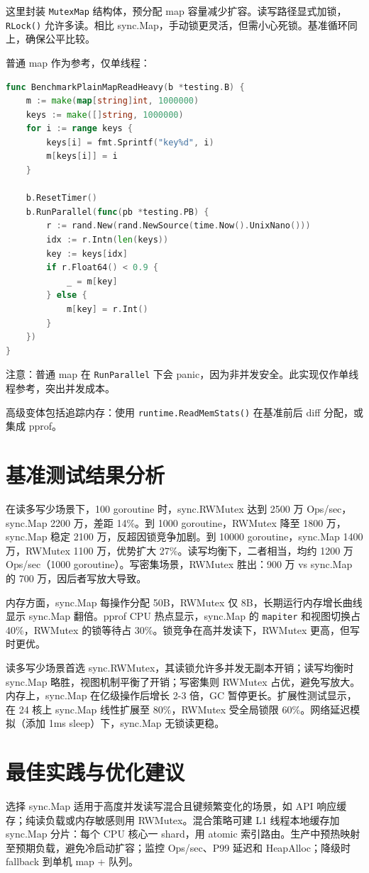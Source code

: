 这里封装 \texttt{MutexMap} 结构体，预分配 map 容量减少扩容。读写路径显式加锁，\texttt{RLock()} 允许多读。相比 sync.Map，手动锁更灵活，但需小心死锁。基准循环同上，确保公平比较。\par
普通 map 作为参考，仅单线程：\par
\begin{lstlisting}[language=go]
func BenchmarkPlainMapReadHeavy(b *testing.B) {
    m := make(map[string]int, 1000000)
    keys := make([]string, 1000000)
    for i := range keys {
        keys[i] = fmt.Sprintf("key%d", i)
        m[keys[i]] = i
    }
    
    b.ResetTimer()
    b.RunParallel(func(pb *testing.PB) {
        r := rand.New(rand.NewSource(time.Now().UnixNano()))
        idx := r.Intn(len(keys))
        key := keys[idx]
        if r.Float64() < 0.9 {
            _ = m[key]
        } else {
            m[key] = r.Int()
        }
    })
}
\end{lstlisting}
注意：普通 map 在 \texttt{RunParallel} 下会 panic，因为非并发安全。此实现仅作单线程参考，突出并发成本。\par
高级变体包括追踪内存：使用 \texttt{runtime.ReadMemStats()} 在基准前后 diff 分配，或集成 pprof。\par
\chapter{基准测试结果分析}
在读多写少场景下，100 goroutine 时，sync.RWMutex 达到 2500 万 Ops/sec，sync.Map 2200 万，差距 14\%{}。到 1000 goroutine，RWMutex 降至 1800 万，sync.Map 稳定 2100 万，反超因锁竞争加剧。到 10000 goroutine，sync.Map 1400 万，RWMutex 1100 万，优势扩大 27\%{}。读写均衡下，二者相当，均约 1200 万 Ops/sec（1000 goroutine）。写密集场景，RWMutex 胜出：900 万 vs sync.Map 的 700 万，因后者写放大导致。\par
内存方面，sync.Map 每操作分配 50B，RWMutex 仅 8B，长期运行内存增长曲线显示 sync.Map 翻倍。pprof CPU 热点显示，sync.Map 的 \texttt{mapiter} 和视图切换占 40\%{}，RWMutex 的锁等待占 30\%{}。锁竞争在高并发读下，RWMutex 更高，但写时更优。\par
读多写少场景首选 sync.RWMutex，其读锁允许多并发无副本开销；读写均衡时 sync.Map 略胜，视图机制平衡了开销；写密集则 RWMutex 占优，避免写放大。内存上，sync.Map 在亿级操作后增长 2-3 倍，GC 暂停更长。扩展性测试显示，在 24 核上 sync.Map 线性扩展至 80\%{}，RWMutex 受全局锁限 60\%{}。网络延迟模拟（添加 1ms sleep）下，sync.Map 无锁读更稳。\par
\chapter{最佳实践与优化建议}
选择 sync.Map 适用于高度并发读写混合且键频繁变化的场景，如 API 响应缓存；纯读负载或内存敏感则用 RWMutex。混合策略可建 L1 线程本地缓存加 sync.Map 分片：每个 CPU 核心一 shard，用 atomic 索引路由。生产中预热映射至预期负载，避免冷启动扩容；监控 Ops/sec、P99 延迟和 HeapAlloc；降级时 fallback 到单机 map + 队列。\par
